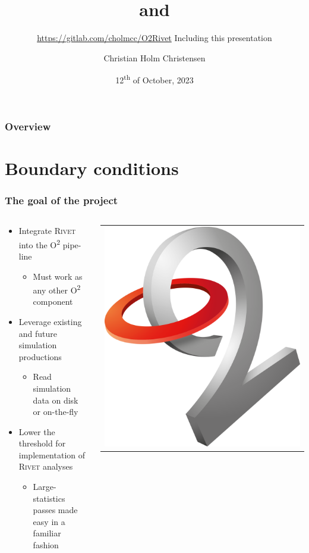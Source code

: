\documentclass[compress,table,8pt]{beamer}
\title{\ALICE{} \Otwo{} and \Rivet}%
\subtitle{\url{https://gitlab.com/cholmcc/O2Rivet}\newline%
  {\footnotesize Including this presentation}}
\author[C.H.Christensen]{Christian Holm Christensen}
\institute{\inst{1}Niels Bohr Institute}
\date[12.~Oct, 2023]{12\textsuperscript{th} of October, 2023}
\newcommand\Rivet{{\scshape Rivet}}
\newcommand\Otwo{O\textsuperscript{2}}
\begin{document}
\aliceTitlePage
\begin{frame}
  \frametitle{Overview}
  \Overview{}
\end{frame}
\section{Boundary conditions}
\begin{frame}
  \frametitle{The goal of the project}
  \begin{columns}
    \begin{column}{.7\linewidth}
      \begin{itemize}
      \item<+-> Integrate \Rivet{} into the \ALICE{} \Otwo{} pipe-line
        \begin{itemize}
        \item Must work as any other \Otwo{} component
        \end{itemize}
      \item<+-> Leverage existing and future simulation productions
        \begin{itemize}
        \item Read simulation data on disk or on-the-fly
        \end{itemize}
      \item<+-> Lower the threshold for implementation of \ALICE{}
        \Rivet{} analyses
        \begin{itemize}
        \item Large-statistics passes made easy in a familiar fashion
        \end{itemize}
      \end{itemize}
    \end{column}
    \begin{column}{.25\linewidth}
      \begin{tabular}{c}
        \includegraphics[width=.8\linewidth]{o2}\\

\end{tabular}
\end{column}
\end{columns}
\end{frame}
\end{document}
